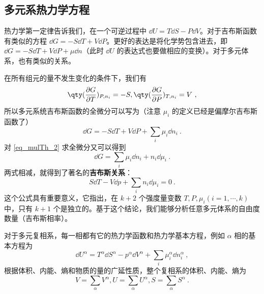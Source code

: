 \subsection{多元系热力学方程}
热力学第一定律告诉我们，在一个可逆过程中 $\dd U=T\dd S-P\dd V$。对于吉布斯函数有类似的方程 $\dd G=-S\dd T+V\dd P$。更好的表达是将化学势包含进去，即 $\dd G=-S\dd T+V\dd P+\mu\dd n$（此时 $\dd U$ 的表达式也要做相应的变换）。对于多元体系，也有类似的关系。

在所有组元的量不发生变化的条件下，我们有
\begin{equation}
\qty(\frac{\partial G}{\partial T})_{P,n_i}=-S,\qty(\frac{\partial G}{\partial P})_{T,n_i}=V~,
\end{equation}
所以多元系统吉布斯函数的全微分可以写为（注意 $\mu_i$ 的定义已经是偏摩尔吉布斯函数了）
\begin{equation}\label{eq_mulTh_3}
\dd G=-S\dd T+V\dd P+\sum_i\mu_i\dd n_i~.
\end{equation}
对 \autoref{eq_mulTh_2} 求全微分又可以得到
\begin{equation}
\dd G=\sum_i\mu_i\dd n_i+n_i\dd \mu_i~.
\end{equation}
两式相减，就得到了著名的\textbf{吉布斯关系}：
\begin{equation}
S\dd T-V\dd p+\sum_i n_i\dd \mu_i=0~.
\end{equation}
这个公式具有重要意义，它指出，在 $k+2$ 个强度量变数 $T,P,\mu_i(i=1,\cdots,k)$ 中，只有 $k+1$ 个是独立的。基于这个结论，我们能够分析任意多元体系的自由度数量（吉布斯相率）。

对于多元复相系，每一相都有它的热力学函数和热力学基本方程，例如 $\alpha$ 相的基本方程为
\begin{equation}
\dd U^\alpha=T^\alpha\dd S^\alpha-p^\alpha\dd V^\alpha+\sum_i\mu_i^\alpha\dd n_i^\alpha~,
\end{equation}
根据体积、内能、熵和物质的量的广延性质，整个复相系的体积、内能、熵为
\begin{equation}
V=\sum_\alpha V^\alpha,U=\sum_\alpha U^\alpha,S=\sum_\alpha S^\alpha~.
\end{equation}
